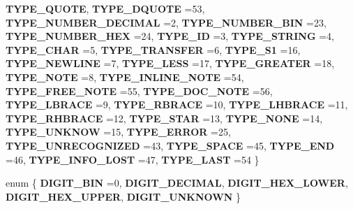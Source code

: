 \begin{DoxyCompactItemize}
{\bfseries T\+Y\+P\+E\+\_\+\+Q\+U\+O\+TE}, 
\newline
{\bfseries T\+Y\+P\+E\+\_\+\+D\+Q\+U\+O\+TE} =53, 
{\bfseries T\+Y\+P\+E\+\_\+\+N\+U\+M\+B\+E\+R\+\_\+\+D\+E\+C\+I\+M\+AL} =2, 
{\bfseries T\+Y\+P\+E\+\_\+\+N\+U\+M\+B\+E\+R\+\_\+\+B\+IN} =23, 
{\bfseries T\+Y\+P\+E\+\_\+\+N\+U\+M\+B\+E\+R\+\_\+\+H\+EX} =24, 
\newline
{\bfseries T\+Y\+P\+E\+\_\+\+ID} =3, 
{\bfseries T\+Y\+P\+E\+\_\+\+S\+T\+R\+I\+NG} =4, 
{\bfseries T\+Y\+P\+E\+\_\+\+C\+H\+AR} =5, 
{\bfseries T\+Y\+P\+E\+\_\+\+T\+R\+A\+N\+S\+F\+ER} =6, 
\newline
{\bfseries T\+Y\+P\+E\+\_\+\+S1} =16, 
{\bfseries T\+Y\+P\+E\+\_\+\+N\+E\+W\+L\+I\+NE} =7, 
{\bfseries T\+Y\+P\+E\+\_\+\+L\+E\+SS} =17, 
{\bfseries T\+Y\+P\+E\+\_\+\+G\+R\+E\+A\+T\+ER} =18, 
\newline
{\bfseries T\+Y\+P\+E\+\_\+\+N\+O\+TE} =8, 
{\bfseries T\+Y\+P\+E\+\_\+\+I\+N\+L\+I\+N\+E\+\_\+\+N\+O\+TE} =54, 
{\bfseries T\+Y\+P\+E\+\_\+\+F\+R\+E\+E\+\_\+\+N\+O\+TE} =55, 
{\bfseries T\+Y\+P\+E\+\_\+\+D\+O\+C\+\_\+\+N\+O\+TE} =56, 
\newline
{\bfseries T\+Y\+P\+E\+\_\+\+L\+B\+R\+A\+CE} =9, 
{\bfseries T\+Y\+P\+E\+\_\+\+R\+B\+R\+A\+CE} =10, 
{\bfseries T\+Y\+P\+E\+\_\+\+L\+H\+B\+R\+A\+CE} =11, 
{\bfseries T\+Y\+P\+E\+\_\+\+R\+H\+B\+R\+A\+CE} =12, 
\newline
{\bfseries T\+Y\+P\+E\+\_\+\+S\+T\+AR} =13, 
{\bfseries T\+Y\+P\+E\+\_\+\+N\+O\+NE} =14, 
{\bfseries T\+Y\+P\+E\+\_\+\+U\+N\+K\+N\+OW} =15, 
{\bfseries T\+Y\+P\+E\+\_\+\+E\+R\+R\+OR} =25, 
\newline
{\bfseries T\+Y\+P\+E\+\_\+\+U\+N\+R\+E\+C\+O\+G\+N\+I\+Z\+ED} =43, 
{\bfseries T\+Y\+P\+E\+\_\+\+S\+P\+A\+CE} =45, 
{\bfseries T\+Y\+P\+E\+\_\+\+E\+ND} =46, 
{\bfseries T\+Y\+P\+E\+\_\+\+I\+N\+F\+O\+\_\+\+L\+O\+ST} =47, 
\newline
{\bfseries T\+Y\+P\+E\+\_\+\+L\+A\+ST} =54
 \}
\item 
\mbox{\label{class_lexical_parser_a964464004be6fad3bcf4714acc61ee11}} 
enum \{ \newline
{\bfseries D\+I\+G\+I\+T\+\_\+\+B\+IN} =0, 
{\bfseries D\+I\+G\+I\+T\+\_\+\+D\+E\+C\+I\+M\+AL}, 
{\bfseries D\+I\+G\+I\+T\+\_\+\+H\+E\+X\+\_\+\+L\+O\+W\+ER}, 
{\bfseries D\+I\+G\+I\+T\+\_\+\+H\+E\+X\+\_\+\+U\+P\+P\+ER}, 
\newline
{\bfseries D\+I\+G\+I\+T\+\_\+\+U\+N\+K\+N\+O\+WN}
 \}
\item 
\mbox{\label{class_lexical_parser_a187d7950fa81fc7b8873c892abc9be6d}} 

\end{DoxyCompactItemize}
